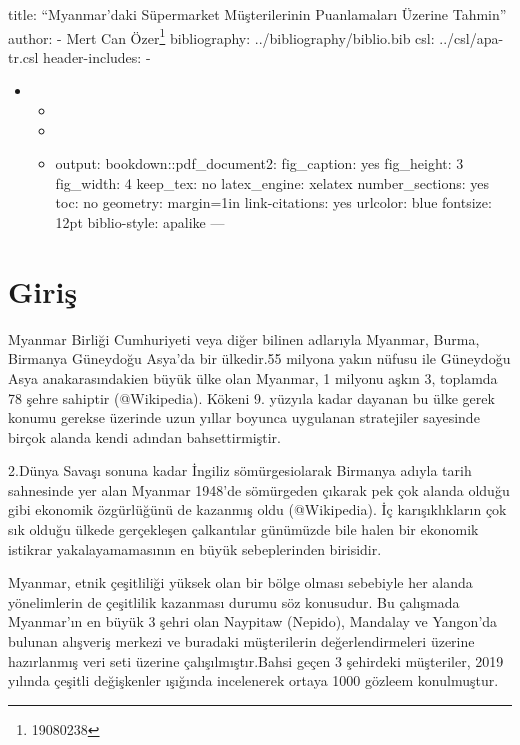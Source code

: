 \documentclass[
]{article}
\author{}
\date{\vspace{-2.5em}}
\begin{document}
title: ``Myanmar'daki Süpermarket Müşterilerinin Puanlamaları Üzerine
Tahmin'' author: - Mert Can Özer\footnote{19080238} bibliography:
../bibliography/biblio.bib csl: ../csl/apa-tr.csl header-includes: -

\usepackage{polyglossia}

\begin{itemize}
\item
  \setmainlanguage{turkish}

  \begin{itemize}
  \item
    \usepackage{booktabs}
  \item
    \usepackage{caption}
  \item
    \captionsetup[table]{skip=10pt}

    output: bookdown::pdf\_document2: fig\_caption: yes fig\_height: 3
    fig\_width: 4 keep\_tex: no latex\_engine: xelatex number\_sections:
    yes toc: no geometry: margin=1in link-citations: yes urlcolor: blue
    fontsize: 12pt biblio-style: apalike ---
  \end{itemize}
\end{itemize}

\hypertarget{giriux15f}{%
\section{Giriş}\label{giriux15f}}

Myanmar Birliği Cumhuriyeti veya diğer bilinen adlarıyla Myanmar, Burma,
Birmanya Güneydoğu Asya'da bir ülkedir.55 milyona yakın nüfusu ile
Güneydoğu Asya anakarasındakien büyük ülke olan Myanmar, 1 milyonu aşkın
3, toplamda 78 şehre sahiptir (@Wikipedia). Kökeni 9. yüzyıla kadar
dayanan bu ülke gerek konumu gerekse üzerinde uzun yıllar boyunca
uygulanan stratejiler sayesinde birçok alanda kendi adından
bahsettirmiştir.

2.Dünya Savaşı sonuna kadar İngiliz sömürgesiolarak Birmanya adıyla
tarih sahnesinde yer alan Myanmar 1948'de sömürgeden çıkarak pek çok
alanda olduğu gibi ekonomik özgürlüğünü de kazanmış oldu (@Wikipedia).
İç karışıklıkların çok sık olduğu ülkede gerçekleşen çalkantılar
günümüzde bile halen bir ekonomik istikrar yakalayamamasının en büyük
sebeplerinden birisidir.

Myanmar, etnik çeşitliliği yüksek olan bir bölge olması sebebiyle her
alanda yönelimlerin de çeşitlilik kazanması durumu söz konusudur. Bu
çalışmada Myanmar'ın en büyük 3 şehri olan Naypitaw (Nepido), Mandalay
ve Yangon'da bulunan alışveriş merkezi ve buradaki müşterilerin
değerlendirmeleri üzerine hazırlanmış veri seti üzerine
çalışılmıştır.Bahsi geçen 3 şehirdeki müşteriler, 2019 yılında çeşitli
değişkenler ışığında incelenerek ortaya 1000 gözleem konulmuştur.
\end{document}

